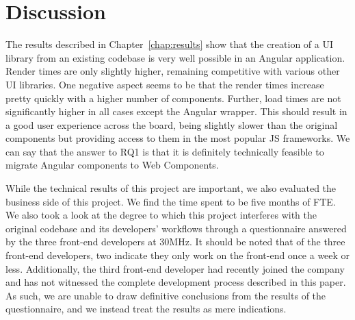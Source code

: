 \chapter{Discussion}\label{chap:discussion}

The results described in Chapter~\ref{chap:results} show that the creation of a UI library from an existing codebase is very well possible in an Angular application. Render times are only slightly higher, remaining competitive with various other UI libraries. One negative aspect seems to be that the render times increase pretty quickly with a higher number of components. Further, load times are not significantly higher in all cases except the Angular wrapper. This should result in a good user experience across the board, being slightly slower than the original components but providing access to them in the most popular JS frameworks. We can say that the answer to RQ1 is that it is definitely technically feasible to migrate Angular components to Web Components.

While the technical results of this project are important, we also evaluated the business side of this project. We find the time spent to be five months of FTE\@. We also took a look at the degree to which this project interferes with the original codebase and its developers' workflows through a questionnaire answered by the three front-end developers at 30MHz. It should be noted that of the three front-end developers, two indicate they only work on the front-end once a week or less. Additionally, the third front-end developer had recently joined the company and has not witnessed the complete development process described in this paper. As such, we are unable to draw definitive conclusions from the results of the questionnaire, and we instead treat the results as mere indications.

